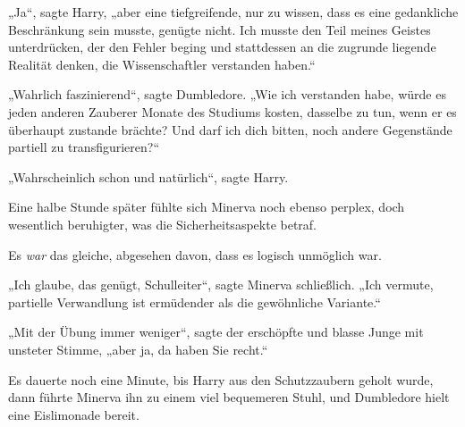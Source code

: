 „Ja“, sagte Harry, „aber eine tiefgreifende, nur zu wissen, dass es eine gedankliche Beschränkung sein musste, genügte nicht. Ich musste den Teil meines Geistes unterdrücken, der den Fehler beging und stattdessen an die zugrunde liegende Realität denken, die Wissenschaftler verstanden haben.“

„Wahrlich faszinierend“, sagte Dumbledore. „Wie ich verstanden habe, würde es jeden anderen Zauberer Monate des Studiums kosten, dasselbe zu tun, wenn er es überhaupt zustande brächte? Und darf ich dich bitten, noch andere Gegenstände partiell zu transfigurieren?“

„Wahrscheinlich schon und natürlich“, sagte Harry.

Eine halbe Stunde später fühlte sich Minerva noch ebenso perplex, doch wesentlich beruhigter, was die Sicherheitsaspekte betraf.

Es \emph{war} das gleiche, abgesehen davon, dass es logisch unmöglich war.

„Ich glaube, das genügt, Schulleiter“, sagte Minerva schließlich. „Ich vermute, partielle Verwandlung ist ermüdender als die gewöhnliche Variante.“

„Mit der Übung immer weniger“, sagte der erschöpfte und blasse Junge mit unsteter Stimme, „aber ja, da haben Sie recht.“

Es dauerte noch eine Minute, bis Harry aus den Schutzzaubern geholt wurde, dann führte Minerva ihn zu einem viel bequemeren Stuhl, und Dumbledore hielt eine Eislimonade bereit.

